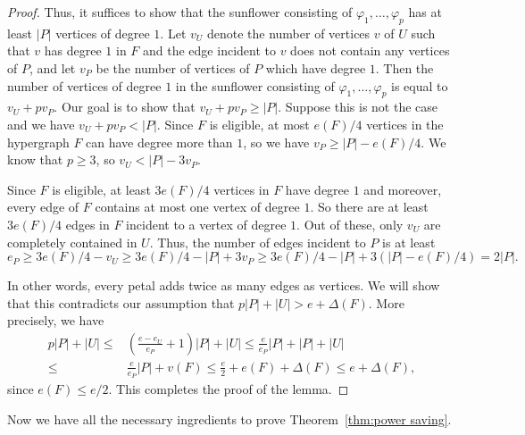 \documentclass[11pt]{article}
\numberwithin{equation}{section}
\theoremstyle{plain}
\theoremstyle{remark}
\begin{document}
\begin{proof}
Thus, it suffices to show that the sunflower consisting of $\varphi_1, \dots, \varphi_p$ has at least $|P|$ vertices of degree $1$. Let $v_U$ denote the number of vertices $v$ of $U$ such that $v$ has degree $1$ in $F$ and the edge incident to $v$ does not contain any vertices of $P$, and let $v_P$ be the number of vertices of $P$ which have degree $1$. Then the number of vertices of degree $1$ in the sunflower consisting of $\varphi_1,\dots,\varphi_p$ is equal to $v_U+pv_P$. Our goal is to show that $v_U+pv_P\geq |P|$. Suppose this is not the case and we have $v_U+pv_P<|P|$. Since $F$ is eligible, at most $e(F)/4$ vertices in the hypergraph $F$ can have degree more than $1$, so we have $v_P\geq |P|-e(F)/4$. We know that $p\geq 3$, so $v_U <  |P|-3v_P$.

Since $F$ is eligible, at least $3e(F)/4$ vertices in $F$ have degree $1$ and moreover, every edge of $F$ contains at most one vertex of degree $1$. So there are at least $3e(F)/4$ edges in $F$ incident to a vertex of degree $1$. Out of these, only $v_U$ are completely contained in $U$. Thus, the number of edges incident to $P$ is at least \[e_P\geq 3e(F)/4-v_U\geq 3e(F)/4-|P|+3v_P\geq 3e(F)/4-|P|+3(|P|-e(F)/4)=2|P|.\] 

In other words, every petal adds twice as many edges as vertices. We will show that this contradicts our assumption that $p|P| + |U| > e + \Delta(F)$. More precisely, we have 
\begin{align*}
p|P|+|U|\leq &\left(\frac{e-e_U}{e_P}+1\right)|P| +|U|\leq \frac{e}{e_P}|P|+|P|+|U|\\
\leq & \frac{e}{e_P}|P|+v(F)\leq \frac{e}{2}+e(F)+\Delta(F)\leq e+\Delta(F),
\end{align*}
since $e(F) \le e/2$. This completes the proof of the lemma.
\end{proof}

Now we have all the necessary ingredients to prove Theorem~\ref{thm:power saving}.
\end{document}
